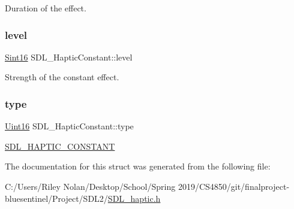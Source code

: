 Duration of the effect. \mbox{\label{struct_s_d_l___haptic_constant_a5b095eea77464623ed57af15f29f4ca6}} 
\subsubsection{\texorpdfstring{level}{level}}
{\footnotesize\ttfamily \mbox{\hyperlink{_s_d_l__stdinc_8h_a9d0257032c0e146ab6121bf0122712f5}{Sint16}} S\+D\+L\+\_\+\+Haptic\+Constant\+::level}

Strength of the constant effect. \mbox{\label{struct_s_d_l___haptic_constant_a5cb31202803a8bc1be95fcede5ac8afb}} 
\subsubsection{\texorpdfstring{type}{type}}
{\footnotesize\ttfamily \mbox{\hyperlink{_s_d_l__stdinc_8h_a31fcc0a076c9068668173ee26d33e42b}{Uint16}} S\+D\+L\+\_\+\+Haptic\+Constant\+::type}

\mbox{\hyperlink{_s_d_l__haptic_8h_a955fb9f680dcf9cc72a3d5263e85b80a}{S\+D\+L\+\_\+\+H\+A\+P\+T\+I\+C\+\_\+\+C\+O\+N\+S\+T\+A\+NT}} 

The documentation for this struct was generated from the following file\+:\begin{DoxyCompactItemize}
\item 
C\+:/\+Users/\+Riley Nolan/\+Desktop/\+School/\+Spring 2019/\+C\+S4850/git/finalproject-\/bluesentinel/\+Project/\+S\+D\+L2/\mbox{\hyperlink{_s_d_l__haptic_8h}{S\+D\+L\+\_\+haptic.\+h}}\end{DoxyCompactItemize}
